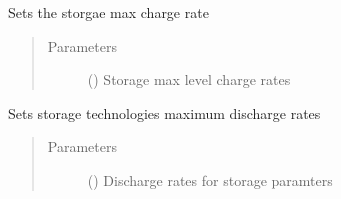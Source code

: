 \documentclass[a4paper,12pt,english]{article}
\begin{document}
\begin{fulllineitems}
\begin{fulllineitems}
\label{\detokenize{GOCPI:GOCPI.CreateCases.CreateCases.set_storage_max_charge_rate}}
Sets the storgae max charge rate
\begin{quote}\begin{description}
\item[{Parameters}] \leavevmode
{} (\sphinxstyleliteralemphasis{\sphinxupquote{, }}) \textendash{} Storage max level charge rates

\end{description}\end{quote}

\end{fulllineitems}


\begin{fulllineitems}
\label{\detokenize{GOCPI:GOCPI.CreateCases.CreateCases.set_storage_max_discharge_rate}}
Sets storage technologies maximum discharge rates
\begin{quote}\begin{description}
\item[{Parameters}] \leavevmode
{} (\sphinxstyleliteralemphasis{\sphinxupquote{, }}) \textendash{} Discharge rates for storage paramters

\end{description}\end{quote}

\end{fulllineitems}



\end{fulllineitems}
\end{document}
